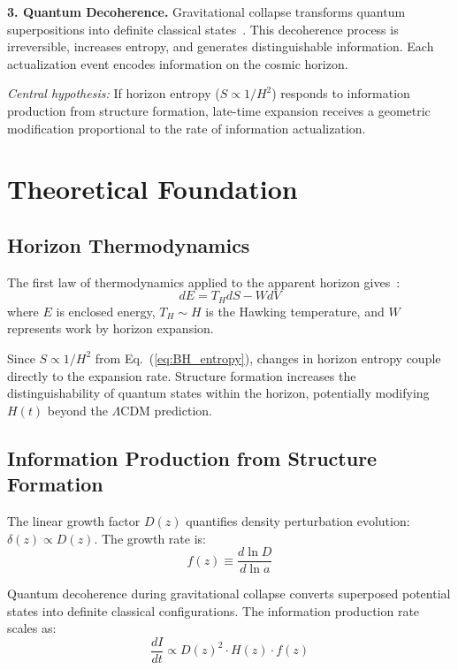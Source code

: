 \documentclass[twocolumn,superscriptaddress,prl,amsmath,amssymb]{revtex4-2}
\begin{document}
\textbf{3. Quantum Decoherence.} Gravitational collapse transforms quantum superpositions into definite classical states~\cite{Zurek2003}. This decoherence process is irreversible, increases entropy, and generates distinguishable information. Each actualization event encodes information on the cosmic horizon.

\textit{Central hypothesis:} If horizon entropy ($S \propto 1/H^2$) responds to information production from structure formation, late-time expansion receives a geometric modification proportional to the rate of information actualization.

\section{Theoretical Foundation}

\subsection{Horizon Thermodynamics}

The first law of thermodynamics applied to the apparent horizon gives~\cite{Cai2005}:
\begin{equation}
dE = T_H dS - W dV
\end{equation}
where $E$ is enclosed energy, $T_H \sim H$ is the Hawking temperature, and $W$ represents work by horizon expansion.

Since $S \propto 1/H^2$ from Eq.~(\ref{eq:BH_entropy}), changes in horizon entropy couple directly to the expansion rate. Structure formation increases the distinguishability of quantum states within the horizon, potentially modifying $H(t)$ beyond the $\Lambda$CDM prediction.

\subsection{Information Production from Structure Formation}

The linear growth factor $D(z)$ quantifies density perturbation evolution: $\delta(z) \propto D(z)$. The growth rate is:
\begin{equation}
f(z) \equiv \frac{d\ln D}{d\ln a}
\end{equation}

Quantum decoherence during gravitational collapse converts superposed potential states into definite classical configurations. The information production rate scales as:
\begin{equation}
\frac{dI}{dt} \propto D(z)^2 \cdot H(z) \cdot f(z)
\end{equation}
\end{document}
